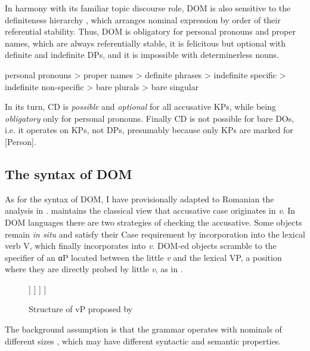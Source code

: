 \documentclass[output=paper,colorlinks,citecolor=brown,nonflat]{langsci/langscibook}
\begin{document}
In harmony with its familiar topic discourse role, DOM is also sensitive to the definiteness hierarchy , which arranges nominal expression by order of their referential stability. Thus, DOM is obligatory for personal pronouns and proper names, which are always referentially stable, it is felicitous but optional with definite and indefinite DPs, and it is impossible with determinerless nouns.

\ea%
      \label{ex:cornilescu:21}
       personal pronouns > proper names > definite phrases > indefinite specific > indefinite non-specific  > bare plurals > bare singular
      \z

In its turn, CD is \textit{possible} and \textit{optional} for all accusative KPs, while being \textit{obligatory} only for personal pronouns. Finally CD is not possible for bare DOs, i.e. it operates on KPs, not DPs, presumably because only KPs are marked for [Person].

\subsection{{The} {syntax} {of} {DOM}}

As for the syntax of DOM, I have provisionally adapted to Romanian the analysis in \citet{López2012}. \citeauthor{López2012} maintains the classical view that accusative case originates in \textit{v}. In DOM languages there are two strategies of checking the accusative. Some objects remain \textit{in situ} and satisfy their Case requirement by incorporation into the lexical verb V, which finally incorporates into \textit{v}. DOM-ed objects scramble to the specifier of an αP located between the little \textit{v} and the lexical VP, a position where they are directly probed by little \textit{v}, as in .


\begin{figure}%
	\begin{forest}
		[\textit{v}P
			[Subject
			]
			[\textit{v}'
				[\textit{v}]
				[αP
					[α]
					[VP
						[V]
						[DO]
					]
				]
			]
		]
	\end{forest}
	\caption{\label{fig:cornilescu:4} Structure of vP proposed by \citep{López2012}}
\end{figure}

The background assumption is that the grammar operates with nominals of different sizes , which may have different syntactic and semantic properties.
\end{document}
